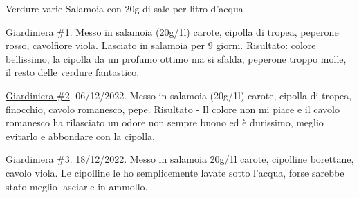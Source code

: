 \cooktime[]{-}%
\begin{ingreds}
	Verdure varie
	Salamoia con 20g di sale per litro d'acqua



\end{ingreds}

\begin{method}
\underline{Giardiniera \#1}. Messo in salamoia (20g/1l) carote, cipolla di tropea, peperone rosso, cavolfiore viola. Lasciato in salamoia per 9 giorni. Risultato: colore bellissimo, la cipolla da un profumo ottimo ma si sfalda, peperone troppo molle, il resto delle verdure fantastico.

\underline{Giardiniera \#2}. 06/12/2022. Messo in salamoia (20g/1l) carote, cipolla di tropea, finocchio, cavolo romanesco, pepe. Risultato - Il colore non mi piace e il cavolo romanesco ha rilasciato un odore non sempre buono ed è durissimo, meglio evitarlo e abbondare con la cipolla.

\underline{Giardiniera \#3}. 18/12/2022. Messo in salamoia 20g/1l carote, cipolline borettane, cavolo viola. Le cipolline le ho semplicemente lavate sotto l'acqua, forse sarebbe stato meglio lasciarle in ammollo.



\end{method}




